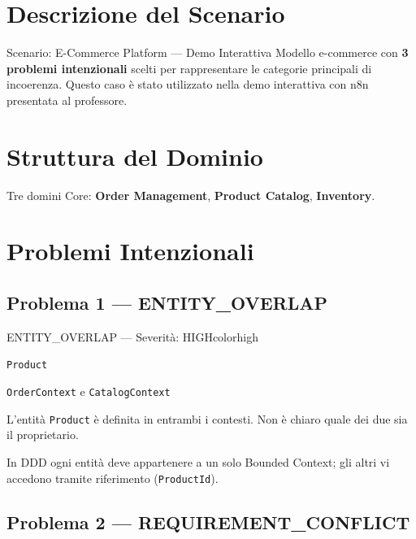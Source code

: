 \documentclass[12pt,a4paper]{report}
\begin{document}
\section{Descrizione del Scenario}

\begin{technicalbox}{Scenario: E-Commerce Platform --- Demo Interattiva}
Modello e-commerce con \textbf{3 problemi intenzionali} scelti per rappresentare le categorie
principali di incoerenza. Questo caso è stato utilizzato nella demo interattiva con n8n
presentata al professore.
\end{technicalbox}

\section{Struttura del Dominio}

Tre domini Core: \textbf{Order Management}, \textbf{Product Catalog}, \textbf{Inventory}.

\section{Problemi Intenzionali}

\subsection{Problema 1 --- ENTITY\_OVERLAP}

\begin{issuebox}{ENTITY\_OVERLAP --- Severità: HIGH}{colorhigh}
\begin{description}[leftmargin=3cm, labelwidth=2.8cm]
  \item[Entità]    \texttt{Product}
  \item[Contesti]  \texttt{OrderContext} e \texttt{CatalogContext}
  \item[Problema]  L'entità \texttt{Product} è definita in entrambi i contesti.
                   Non è chiaro quale dei due sia il proprietario.
  \item[Regola DDD] In DDD ogni entità deve appartenere a un solo Bounded Context;
                   gli altri vi accedono tramite riferimento (\texttt{ProductId}).
\end{description}
\end{issuebox}

\subsection{Problema 2 --- REQUIREMENT\_CONFLICT}
\end{document}
